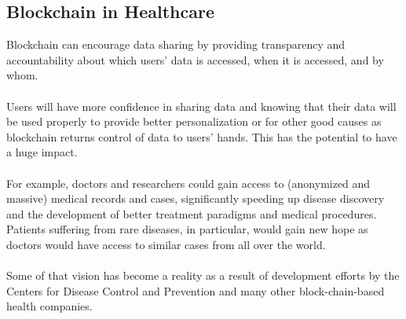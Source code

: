 \documentclass[12pt,letterpaper]{article}
\begin{document}
\pagebreak
    \subsection*{Blockchain in Healthcare}
    Blockchain can encourage data sharing by providing transparency and accountability about which users' data is accessed, when it is accessed, and by whom.
    \\
    \\
    Users will have more confidence in sharing data and knowing that their data will be used properly to provide better personalization or for other good causes as blockchain returns control of data to users' hands. This has the potential to have a huge impact.
    \\
    \\
    For example, doctors and researchers could gain access to (anonymized and massive) medical records and cases, significantly speeding up disease discovery and the development of better treatment paradigms and medical procedures. Patients suffering from rare diseases, in particular, would gain new hope as doctors would have access to similar cases from all over the world.
    \\
    \\
    Some of that vision has become a reality as a result of development efforts by the Centers for Disease Control and Prevention and many other block-chain-based health companies.


    
  
\end{document}
